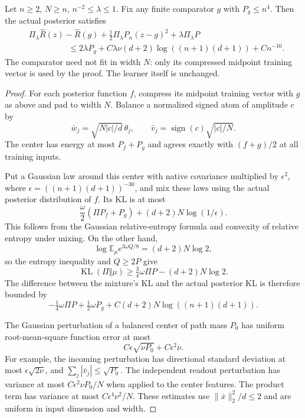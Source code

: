 \begin{lemma}
\label{lem:general-shallow-midpoint}
Let $n\ge2$, $N\ge n$, $n^{-2}\le\lambda\le1$.
Fix any finite comparator $g$ with $P_g\le n^4$.
Then the actual posterior satisfies
\begin{align}
 &\Pi_\lambda\widehat R(z)-\widehat R(g)
 +\tfrac12\Pi_\lambda P_n(z-g)^2+\lambda\Pi_\lambda P\\
 &\hspace{2cm}\le2\lambda P_g+
 C\lambda\nu(d+2)\log((n+1)(d+1))+Cn^{-10}. \tag{GM1}
\end{align}
The comparator need not fit in width $N$: only its compressed midpoint
training vector is used by the proof. The learner itself is unchanged.
\end{lemma}
\begin{proof}
For each posterior function $f$, compress its midpoint training vector
with $g$ as above and pad to width $N$. Balance a normalized signed
atom of amplitude $c$ by
\[
 \bar w_j=\sqrt{N|c|/d}\,\theta_j,
 \qquad \bar v_j=\operatorname{sign}(c)\sqrt{|c|/N}.
\]
The center has energy at most $P_f+P_g$ and agrees exactly with
$(f+g)/2$ at all training inputs.

Put a Gaussian law around this center with native covariance
multiplied by $\epsilon^2$, where
$\epsilon=((n+1)(d+1))^{-30}$, and mix these laws using the actual
posterior distribution of $f$. Its KL is at most
\[
 \frac\omega2(\Pi P_f+P_g)+(d+2)N\log(1/\epsilon).
\]
This follows from the Gaussian relative-entropy formula and
convexity of relative entropy under mixing. On the other hand,
\[
 \log\mathbb E_\mu e^{3\omega Q/8}=(d+2)N\log2,
\]
so the entropy inequality and $Q\ge2P$ give
\[
 \operatorname{KL}(\Pi\Vert\mu)
 \ge\tfrac34\omega\Pi P-(d+2)N\log2.
\]
The difference between the mixture's KL and the actual posterior KL
is therefore bounded by
\[
 -\tfrac14\omega\Pi P+\tfrac12\omega P_g
       +C(d+2)N\log((n+1)(d+1)). \tag{GM2}
\]

The Gaussian perturbation of a balanced center of path mass $P_0$
has uniform root-mean-square function error at most
\[
 C\epsilon\sqrt{\nu P_0}+C\epsilon^2\nu. \tag{GM3}
\]
For example, the incoming perturbation has directional standard
deviation at most $\epsilon\sqrt{2\nu}$, and
$\sum_j|\bar v_j|\le\sqrt{P_0}$. The independent readout perturbation
has variance at most $C\epsilon^2\nu P_0/N$ when applied to the center
features. The product term has variance at most
$C\epsilon^4\nu^2/N$. These estimates use
$\|\bar x\|_2^2/d\le2$ and are uniform in input dimension and width.


\end{proof}
